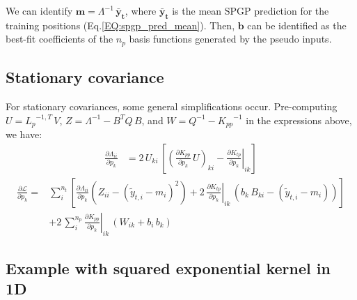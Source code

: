 \documentclass[11pt,a4paper]{article}
\newcommand\req[1]{Eq.\;\ref{#1}}
\numberwithin{equation}{section}
\begin{document}
We can identify $\mathbf{m} = \Lambda^{-1}\,\mathbf{\bar{y}_t}$, where $\mathbf{\bar{y}_t}$ is the mean SPGP prediction for the training positions (\req{EQ:spgp_pred_mean}). Then, $\mathbf{b}$ can be identified as the best-fit coefficients of the $n_p$ basis functions generated by the pseudo inputs.

\subsection{Stationary covariance}

For stationary covariances, some general simplifications occur. Pre-computing $U={L_{p}}^{-1,T}\,V$, $Z=\Lambda^{-1} - B^T Q\,B$, and $W=Q^{-1} - {K_{pp}}^{-1}$ in the expressions above, we have:
\begin{align}
\frac{\partial \Lambda_{ii}}{\partial p_k} &= 2\,U_{ki}\,\left[\left(\frac{\partial K_{pp}}{\partial p_k}\,U\right)_{ki} -\left.\frac{\partial K_{tp}}{\partial p_k}\right|_{ik}\right]
\end{align}
\begin{align}
\frac{\partial \mathcal{L}}{\partial p_k} =
&\sum_{i}^{n_t} \left[\frac{\partial \Lambda_{ii}}{\partial p_k}\left(Z_{ii} - (\tilde{y}_{t,i} - m_i)^2\right) +
2\,\left.\frac{\partial K_{tp}}{\partial p_k}\right|_{ik}\,\left(b_k\,B_{ki} - \left(\tilde{y}_{t,i} - m_i\right)\right)\right] \nonumber \\
&+2\,\sum_{i}^{n_p} \left.\frac{\partial K_{pp}}{\partial p_k}\right|_{ik}\,\left(W_{ik} + b_i\,b_k\right)
\end{align}

\subsection{Example with squared exponential kernel in 1D}
\end{document}
